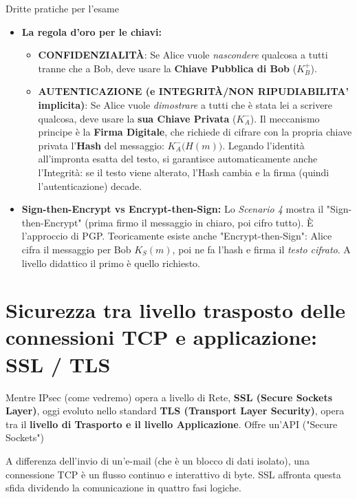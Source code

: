 \documentclass[a4paper,12pt]{report}
\newcommand{\KAm}{K_A^-} %
\newcommand{\KBp}{K_B^+} %
\begin{document}
\vspace{0.4cm}
\begin{esempiobox}{Dritte pratiche per l'esame}
\begin{itemize}
    \item \textbf{La regola d'oro per le chiavi:}
    \begin{itemize}
        \item \textbf{CONFIDENZIALITÀ}:
        Se Alice vuole \textit{nascondere} qualcosa a tutti tranne che a Bob, deve usare la \textbf{Chiave Pubblica di Bob} ($\KBp$). 

        \item \textbf{AUTENTICAZIONE (e INTEGRITÀ/NON RIPUDIABILITA' implicita)}:
        Se Alice vuole \textit{dimostrare} a tutti che è stata lei a scrivere qualcosa, deve usare la \textbf{sua Chiave Privata} ($\KAm$). 
        Il meccanismo principe è la \textbf{Firma Digitale}, che richiede di cifrare con la propria chiave privata l'\textbf{Hash} del messaggio: $\KAm\bigl(H(m)\bigr)$. Legando l'identità all'impronta esatta del testo, si garantisce automaticamente anche l'Integrità: se il testo viene alterato, l'Hash cambia e la firma (quindi l'autenticazione) decade.
    \end{itemize}
    
    \item \textbf{Sign-then-Encrypt vs Encrypt-then-Sign:} Lo \textit{Scenario 4} mostra il "Sign-then-Encrypt" (prima firmo il messaggio in chiaro, poi cifro tutto). È l'approccio di PGP. Teoricamente esiste anche "Encrypt-then-Sign": Alice cifra il messaggio per Bob $K_S(m)$, poi ne fa l'hash e firma il \textit{testo cifrato}. A livello didattico il primo è quello richiesto.
\end{itemize}
\end{esempiobox}






\newpage
\section{Sicurezza tra livello trasposto  delle connessioni TCP e applicazione: SSL / TLS}

Mentre IPsec (come vedremo) opera a livello di Rete, \textbf{SSL (Secure Sockets Layer)}, oggi evoluto nello standard \textbf{TLS (Transport Layer Security)}, opera tra il \textbf{livello di Trasporto e il livello Applicazione}. Offre un'API ("Secure Sockets")

A differenza dell'invio di un'e-mail (che è un blocco di dati isolato), una connessione TCP è un flusso continuo e interattivo di byte. SSL affronta questa sfida dividendo la comunicazione in quattro fasi logiche.
\end{document}
